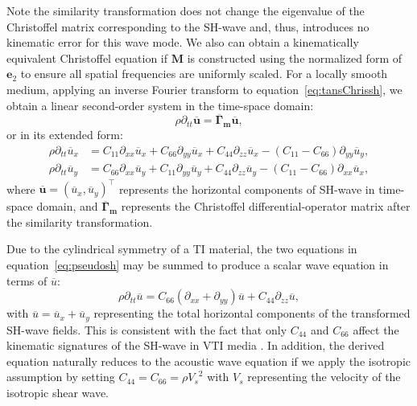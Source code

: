 Note the similarity transformation does not change the eigenvalue of the Christoffel
matrix corresponding to the SH-wave and, thus, introduces no kinematic error for this wave mode.
We also can obtain a kinematically equivalent Christoffel equation if $\mathbf{M}$ is constructed using 
the normalized form of $\mathbf{e}_2$ to ensure all spatial frequencies are uniformly scaled.
For a locally smooth medium, applying an inverse Fourier transform to
equation~\ref{eq:tansChrissh}, we obtain a linear second-order system in the time-space domain:
\begin{equation}
\label{eq:tansElasticsh}
\rho\partial_{tt}\overline{\mathbf{u}} =
\overline{\mathbf{\Gamma}}_\mathbf{m}\overline{\mathbf{u}},
\end{equation}
or in its extended form:
\begin{equation}
\label{eq:pseudosh}
\begin{split}
	\rho\partial_{tt}\overline{u}_x &= C_{11}\partial_{xx}{\overline{u}_x}
	+ C_{66}\partial_{yy}{\overline{u}_x}+
	C_{44}\partial_{zz}{\overline{u}_x}
	-(C_{11}-C_{66})\partial_{yy}{\overline{u}_y}, \\
	\rho\partial_{tt}\overline{u}_y &= C_{66}\partial_{xx}{\overline{u}_y}
	+ C_{11}\partial_{yy}{\overline{u}_y} +
	C_{44}\partial_{zz}{\overline{u}_y}
	- (C_{11}-C_{66})\partial_{xx}{\overline{u}_x},
\end{split}
\end{equation}
where $\overline{\mathbf{u}}=(\overline{u}_x, \overline{u}_y)^{\top}$
represents the horizontal components of SH-wave in time-space domain, and
$\overline{\mathbf{\Gamma}}_\mathbf{m}$
 represents the Christoffel differential-operator matrix after the similarity transformation.

Due to the cylindrical symmetry of a TI material, the two equations in equation~\ref{eq:pseudosh} may be summed to 
	produce a scalar wave equation in terms of $\overline{u}$:
\begin{equation}
\label{eq:pseudosh1}
\rho\partial_{tt}\overline{u} =
C_{66}(\partial_{xx}+\partial_{yy}){\overline{u}}+C_{44}\partial_{zz}{\overline{u}},
\end{equation}
with $\overline{u}=\overline{u}_{x}+\overline{u}_{y}$ representing the total horizontal components of the transformed SH-wave fields.
This is consistent with the fact that only $C_{44}$ and $C_{66}$ affect the kinematic signatures of the
SH-wave in VTI media \cite[]{tsvankin:2001}. In addition,  the derived equation naturally reduces to the acoustic wave equation if we apply the isotropic assumption by setting $C_{44}=C_{66}=\rho{V_s}^2$ with $V_s$ representing the velocity of the isotropic shear wave.

